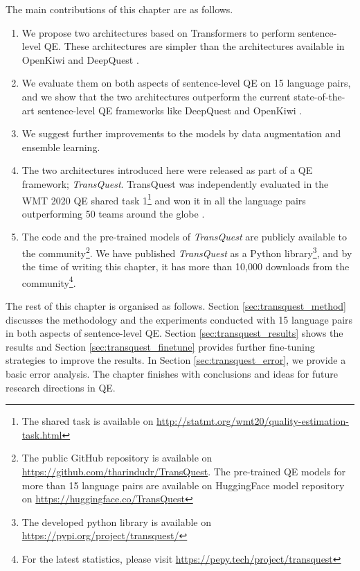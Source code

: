      
The main contributions of this chapter are as follows.
\begin{enumerate}
	\item We propose two architectures based on Transformers to perform sentence-level QE. These architectures are simpler than the architectures available in OpenKiwi and DeepQuest \autocite{lee-2020-two, wang-etal-2018-alibaba}. 
	
	\item We evaluate them on both aspects of sentence-level QE on 15 language pairs, and we show that the two architectures outperform the current state-of-the-art sentence-level QE frameworks like DeepQuest \autocite{ive-etal-2018-deepquest} and OpenKiwi \autocite{kepler-etal-2019-openkiwi}.
	
	\item We suggest further improvements to the models by data augmentation and ensemble learning.
		
	\item The two architectures introduced here were released as part of a QE framework; \textit{TransQuest}. TransQuest was independently evaluated in the WMT 2020 QE shared task 1\footnote{The shared task is available on \url{http://statmt.org/wmt20/quality-estimation-task.html}} \autocite{specia-etal-2020-findings-wmt} and won it in all the language pairs outperforming 50 teams around the globe \autocite{ranasinghe-etal-2020-transquest-wmt2020}.
	
	\item The code and the pre-trained models of \textit{TransQuest} are publicly available to the community\footnote{The public GitHub repository is available on \url{https://github.com/tharindudr/TransQuest}. The pre-trained QE models for more than 15 language pairs are available on HuggingFace model repository on \url{https://huggingface.co/TransQuest}}. We have published \textit{TransQuest} as a Python library\footnote{The developed python library is available on \url{https://pypi.org/project/transquest/}}, and by the time of writing this chapter, it has more than 10,000 downloads from the community\footnote{For the latest statistics, please visit \url{https://pepy.tech/project/transquest}}. 
	
\end{enumerate}

The rest of this chapter is organised as follows. Section \ref{sec:transquest_method} discusses the methodology and the experiments conducted with 15 language pairs in both aspects of sentence-level QE.  Section \ref{sec:transquest_results} shows the results and Section \ref{sec:transquest_finetune} provides further fine-tuning strategies to improve the results. In Section \ref{sec:transquest_error}, we provide a basic error analysis. The chapter finishes with conclusions and ideas for future research directions in QE.

